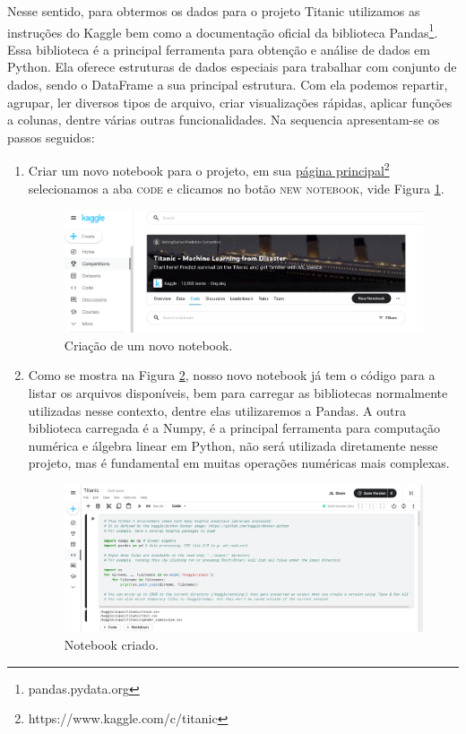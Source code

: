\documentclass{article}
\begin{document}
Nesse sentido, para obtermos os dados para o projeto Titanic utilizamos as instruções do Kaggle bem como a documentação oficial da biblioteca Pandas\footnote{pandas.pydata.org}. Essa biblioteca é a principal ferramenta para obtenção e análise de dados em Python. Ela oferece estruturas de dados especiais para trabalhar com conjunto de dados, sendo o DataFrame a sua principal estrutura. Com ela podemos repartir, agrupar, ler diversos tipos de arquivo, criar visualizações rápidas, aplicar funções a colunas, dentre várias outras funcionalidades.
Na sequencia apresentam-se os passos seguidos:
\begin{enumerate}
    \item Criar um novo notebook para o projeto, em sua \href{https://www.kaggle.com/c/titanic}{página principal}\footnote{https://www.kaggle.com/c/titanic} selecionamos a aba \textsc{code} e clicamos no botão \textsc{new notebook}, vide Figura \ref{create_notebook}.
    \begin{figure}[H]
     \centering
     \includegraphics[width=\textwidth]{Figures/create_notebook.png}
     \caption{\label{create_notebook}Criação de um novo notebook.}
    \end{figure}
    
    \item Como se mostra na Figura \ref{new_notebook}, nosso novo notebook já tem o código para a listar os arquivos disponíveis, bem para carregar as bibliotecas normalmente utilizadas nesse contexto, dentre elas utilizaremos a Pandas. A outra biblioteca carregada é a Numpy, é a principal ferramenta para computação numérica e álgebra linear em Python, não será utilizada diretamente nesse projeto, mas é fundamental em muitas operações numéricas mais complexas.   
    \begin{figure}[H]
     \centering
     \includegraphics[width=\textwidth]{Figures/kaggle_new_notebook.png}
     \caption{\label{new_notebook}Notebook criado.}
    \end{figure}
    

\end{enumerate}
\end{document}
